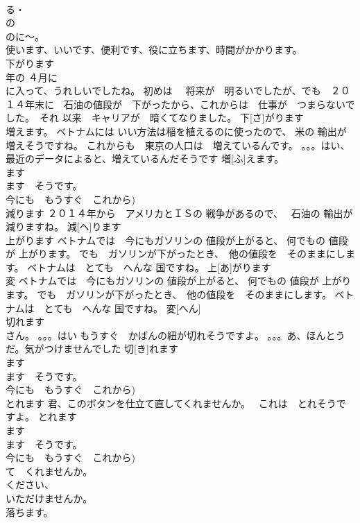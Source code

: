 \documentclass[8pt]{extreport}
\begin{document}
\begin{CJK}{UTF8}{min}
\\	る・
\\	の　
\\	のに～。
\\	使います、いいです、便利です、役に立ちます、時間がかかります。	
\\	下がります	
\\	年の ４月に　 
\\	に入って、うれしいでしたね。 初めは　 将来が　明るいでしたが、でも　２０１４年末に　石油の値段が　下がったから、これからは　仕事が　つまらないでした。　それ 以来　キャリアが　暗くてなりました。	下[さ]がります			
\\	増えます。	ベトナムには いい方法は稲を植えるのに使ったので、 米の 輸出が増えそうですね。 これからも　東京の人口は　増えているんです。 。。。はい、最近のデータによると、増えているんだそうです	増[ふ]えます。			
\\	ます　
\\	ます　そうです。
\\	今にも　もうすぐ　これから)	
\\	減ります	２０１４年から　アメリカとＩＳの 戦争があるので、　 石油の 輸出が減りますね。	減[へ]ります			
\\	上がります	ベトナムでは　今にもガソリンの 値段が上がると、 何でもの 値段が 上がります。 でも　ガソリンが下がったとき、　他の値段を　そのままにします。 ベトナムは　とても　へんな 国ですね。	上[あ]がります			
\\	変	ベトナムでは　今にもガソリンの 値段が上がると、 何でもの 値段が 上がります。 でも　ガソリンが下がったとき、　他の値段を　そのままにします。 ベトナムは　とても　へんな 国ですね。	変[へん]			
\\	切れます	
\\	さん。 。。。はい もうすぐ　かばんの紐が切れそうですよ。 。。。あ、ほんとうだ。気がつけませんでした	切[き]れます			
\\	ます　
\\	ます　そうです。
\\	今にも　もうすぐ　これから)	
\\	とれます	君、このボタンを仕立て直してくれませんか。　 これは　とれそうですよ。	とれます				
\\	ます　
\\	ます　そうです。
\\	今にも　もうすぐ　これから) 
\\	て　くれませんか。
\\	ください、
\\	いただけませんか。		
\\	落ちます。	

\end{CJK}
\end{document}
